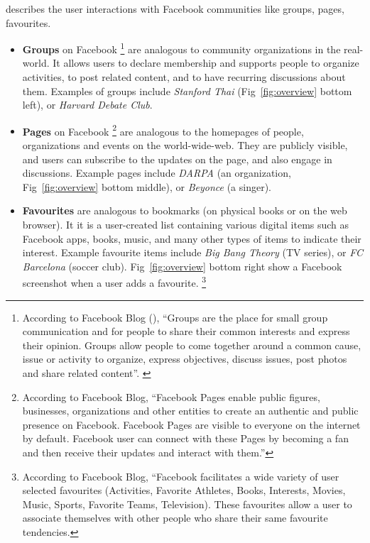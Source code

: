  describes the user interactions with Facebook communities like groups, pages, favourites.
\begin{itemize}
  \item \textbf{Groups} on Facebook 
\footnote{According to Facebook Blog (), ``Groups are the place for small group communication and for people to share their common interests and express their opinion. Groups allow people to come together around a common cause, issue or activity to organize, express objectives, discuss issues, post photos and share related content''. 
\label{fn:fbblog}}
are analogous to community organizations in the real-world. It allows users to declare membership and supports people to organize activities, to post related content, and to have recurring discussions about them.  Examples of groups include {\em Stanford Thai} (Fig~\ref{fig:overview} bottom left), or {\em Harvard Debate Club}.
  \item \textbf{Pages} on Facebook
  \footnote{According to Facebook Blog, ``Facebook Pages enable public figures, businesses, organizations and other entities to create an authentic and public presence on Facebook. Facebook Pages are visible to everyone on the internet by default. Facebook user can connect with these Pages by becoming a fan and then receive their updates and interact with them.'' }
  are analogous to the homepages of people, organizations and events on the world-wide-web. They are publicly visible, and users can subscribe to the updates on the page, and also engage in discussions. Example pages include {\em DARPA} (an organization, Fig~\ref{fig:overview} bottom middle), or {\em Beyonce} (a singer).

  \item \textbf{Favourites} are analogous to bookmarks (on physical books or on the web browser). It it is a user-created list containing various digital items such as Facebook apps, books, music, and many other types of items to indicate their interest. Example favourite items include {\em Big Bang Theory} (TV series), or {\em FC Barcelona} (soccer club). Fig~\ref{fig:overview} bottom right show a Facebook screenshot when a user adds a favourite.
  \footnote{According to Facebook Blog, ``Facebook facilitates a wide variety of user selected favourites (Activities, Favorite Athletes, Books, Interests, Movies, Music, Sports, Favorite Teams, Television). These favourites allow a user to associate themselves with other people who share their same favourite tendencies.}
\end{itemize} 

